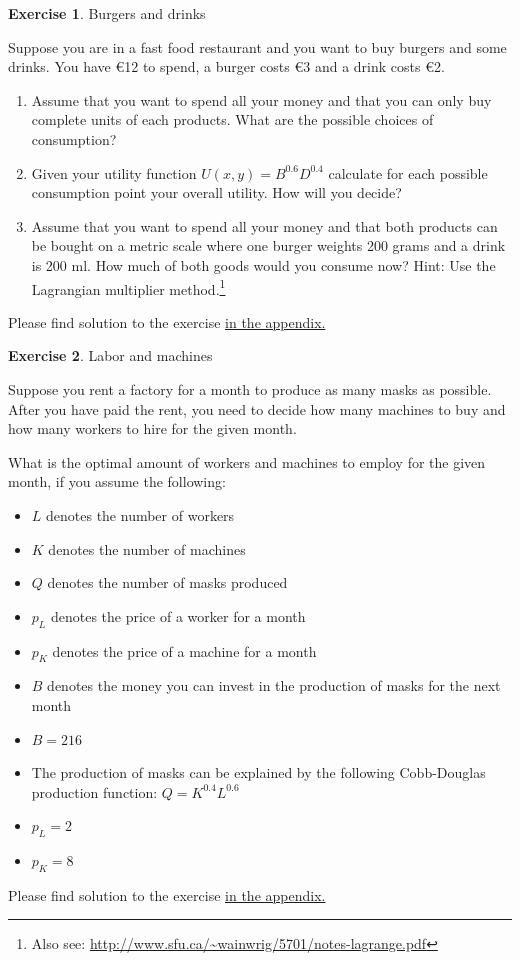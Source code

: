 \documentclass[
  12pt,
  oneside]{book}
\providecommand{\tightlist}{%
  \setlength{\itemsep}{0pt}\setlength{\parskip}{0pt}}
\theoremstyle{definition}
\theoremstyle{definition}
\theoremstyle{definition}
\newtheorem{exercise}{Exercise}[chapter]
\theoremstyle{definition}
\theoremstyle{remark}
\begin{document}
\begin{exercise}
\protect\hypertarget{exr:burgerutility1}{}\label{exr:burgerutility1}Burgers and drinks

Suppose you are in a fast food restaurant and you want to buy burgers and some drinks. You have €12 to spend, a burger costs €3 and a drink costs €2.

\begin{enumerate}
\def\labelenumi{\alph{enumi})}
\tightlist
\item
  Assume that you want to spend all your money and that you can only buy complete units of each products. What are the possible choices of consumption?
\item
  Given your utility function \(U(x,y)=B^{0.6}D^{0.4}\) calculate for each possible consumption point your overall utility. How will you decide?
\item
  Assume that you want to spend all your money and that both products can be bought on a metric scale where one burger weights 200 grams and a drink is 200 ml. How much of both goods would you consume now? Hint: Use the Lagrangian multiplier method.\footnote{Also see: \url{http://www.sfu.ca/~wainwrig/5701/notes-lagrange.pdf}}
\end{enumerate}

Please find solution to the exercise \hyperref[sol:burgerutility1]{in the appendix.}
\end{exercise}

\begin{exercise}
\protect\hypertarget{exr:lama}{}\label{exr:lama}Labor and machines

Suppose you rent a factory for a month to produce as many masks as possible. After you have paid the rent, you need to decide how many machines to buy and how many workers to hire for the given month.

What is the optimal amount of workers and machines to employ for the given month, if you assume the following:

\begin{itemize}
\tightlist
\item
  \(L\) denotes the number of workers
\item
  \(K\) denotes the number of machines
\item
  \(Q\) denotes the number of masks produced
\item
  \(p_L\) denotes the price of a worker for a month
\item
  \(p_K\) denotes the price of a machine for a month
\item
  \(B\) denotes the money you can invest in the production of masks for the next month
\item
  \(B = 216\)
\item
  The production of masks can be explained by the following Cobb-Douglas production function: \(Q = K^{0.4}L^{0.6}\)
\item
  \(p_L = 2\)
\item
  \(p_K = 8\)
\end{itemize}

Please find solution to the exercise \hyperref[sol:lama]{in the appendix.}
\end{exercise}
\end{document}

